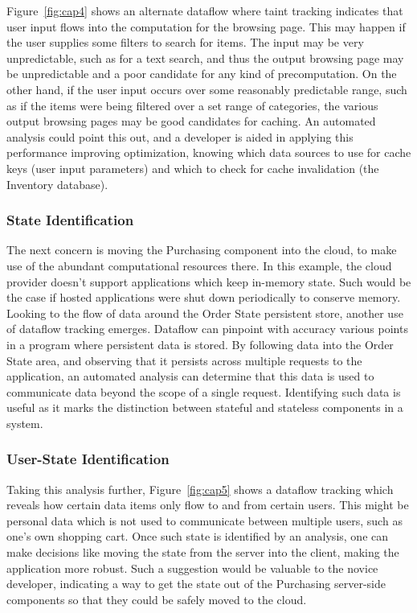 \documentclass[msc,oneside]{ubcthesis}
\begin{document}
Figure~\ref{fig:cap4} shows an alternate dataflow where taint tracking indicates that user input flows into the computation for the browsing page. This may happen if the user supplies some filters to search for items. The input may be very unpredictable, such as for a text search, and thus the output browsing page may be unpredictable and a poor candidate for any kind of precomputation. On the other hand, if the user input occurs over some reasonably predictable range, such as if the items were being filtered over a set range of categories, the various output browsing pages may be good candidates for caching. An automated analysis could point this out, and a developer is aided in applying this performance improving optimization, knowing which data sources to use for cache keys (user input parameters) and which to check for cache invalidation (the Inventory database).

\subsubsection{State Identification}
The next concern is moving the Purchasing component into the cloud, to make use of the abundant computational resources there. In this example, the cloud provider doesn't support applications which keep in-memory state. Such would be the case if hosted applications were shut down periodically to conserve memory. Looking to the flow of data around the Order State persistent store, another use of dataflow tracking emerges. Dataflow can pinpoint with accuracy various points in a program where persistent data is stored. By following data into the Order State area, and observing that it persists across multiple requests to the application, an automated analysis can determine that this data is used to communicate data beyond the scope of a single request. Identifying such data is useful as it marks the distinction between stateful and stateless components in a system.

\subsubsection{User-State Identification}
Taking this analysis further, Figure~\ref{fig:cap5} shows a dataflow tracking which reveals how certain data items only flow to and from certain users. This might be personal data which is not used to communicate between multiple users, such as one's own shopping cart. Once such state is identified by an analysis, one can make decisions like moving the state from the server into the client, making the application more robust. Such a suggestion would be valuable to the novice developer, indicating a way to get the state out of the Purchasing server-side components so that they could be safely moved to the cloud.
\end{document}
